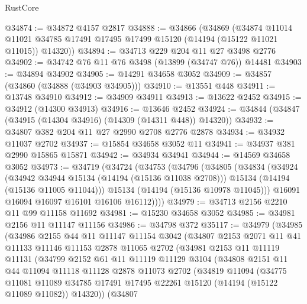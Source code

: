 \begin{lexlean}{RustCore}
\begin{coremodule}
@34874 := @34872 @4157 @2817
@34888 := @34866
    (@34869
      (@34874
        @11014
        @11021
        @34785
        @17491
        @17495
        @17499
        @15120
        (@14194 (@15122 @11021 @11015))
        @14320))
@34894 := @34713 @229 @204 @11 @27 @3498 @2776
@34902 := @34742 @76 @11 @76 @3498 (@13899 (@34747 @76)) @14481
@34903 := @34894 @34902
@34905 := @14291 @34658 @3052
@34909 := @34857 (@34860 (@34888 (@34903 @34905)))
@34910 := @13551 @448
@34911 := @13748 @34910
@34912 := @34909 @34911
@34913 := @13622 @2452
@34915 := @34912 (@14300 @34913)
@34916 := @13646 @2452
@34924 := @34844 (@34847 (@34915 (@14304 @34916) (@14309 (@14311 @448)) @14320))
@34932 := @34807 @382 @204 @11 @27 @2990 @2708 @2776 @2878
@34934 := @34932 @11037 @2702
@34937 := @15854 @34658 @3052 @11
@34941 := @34937 @381 @2990 @15865 @15871
@34942 := @34934 @34941
@34944 := @14569 @34658 @3052
@34973 := @34719
    (@34724
      (@34753
        (@34796
          (@34805
            (@34834
              (@34924
                (@34942 @34944 @15134 (@14194 (@15136 @11038 @2708)))
                @15134
                (@14194 (@15136 @11005 @11044)))
              @15134
              (@14194 (@15136 @10978 @11045)))
            @16091
            @16094
            @16097
            @16101
            @16106
            @16112))))
@34979 := @34713 @2156 @2210 @11 @99 @11158 @11692
@34981 := @15230 @34658 @3052
@34985 := @34981 @2156 @11 @11147 @11156
@34986 := @34798 @372
@35117 := @34979
    (@34985
      (@34986
        @2155
        @44
        @11
        @11147
        @11154
        @3042
        (@34807
          @2153
          @2071
          @11
          @41
          @11133
          @11146
          @11153
          @2878
          @11065
          @2702
          (@34981
            @2153
            @11
            @11119
            @11131
            (@34799
              @2152
              @61
              @11
              @11119
              @11129
              @3104
              (@34808
                @2151
                @11
                @44
                @11094
                @11118
                @11128
                @2878
                @11073
                @2702
                (@34819
                  @11094
                  (@34775
                    @11081
                    @11089
                    @34785
                    @17491
                    @17495
                    @22261
                    @15120
                    (@14194 (@15122 @11089 @11082))
                    @14320))
                (@34807

\end{coremodule}
\end{lexlean}
